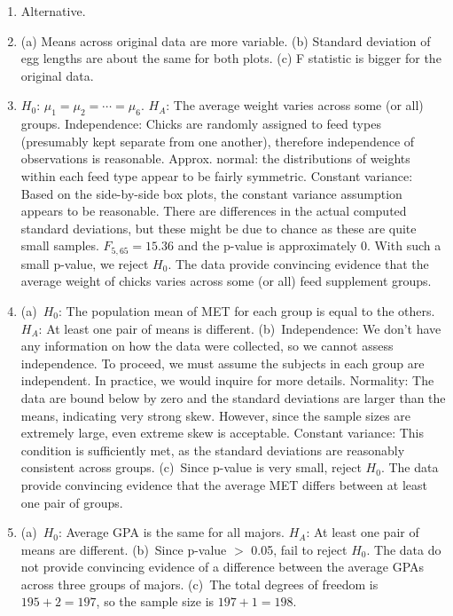 \documentclass[
  10pt,
  openany]{book}
\providecommand{\tightlist}{%
  \setlength{\itemsep}{0pt}\setlength{\parskip}{0pt}}
\begin{document}
\begin{enumerate}
\def\labelenumi{\arabic{enumi}.}
\tightlist
\item
  Alternative.

  \addtocounter{enumi}{1}
\item
  (a) Means across original data are more variable. (b) Standard deviation of egg lengths are about the same for both plots. (c) F statistic is bigger for the original data.

  \addtocounter{enumi}{1}
\item
  \(H_0\): \(\mu_1 = \mu_2 = \cdots = \mu_6\). \(H_A\): The average weight varies across some (or all) groups. Independence: Chicks are randomly assigned to feed types (presumably kept separate from one another), therefore independence of observations is reasonable. Approx. normal: the distributions of weights within each feed type appear to be fairly symmetric. Constant variance: Based on the side-by-side box plots, the constant variance assumption appears to be reasonable. There are differences in the actual computed standard deviations, but these might be due to chance as these are quite small samples. \(F_{5,65} = 15.36\) and the p-value is approximately 0. With such a small p-value, we reject \(H_0\). The data provide convincing evidence that the average weight of chicks varies across some (or all) feed supplement groups.

  \addtocounter{enumi}{1}
\item
  (a)~\(H_0\): The population mean of MET for each group is equal to the others. \(H_A\): At least one pair of means is different. (b)~Independence: We don't have any information on how the data were collected, so we cannot assess independence. To proceed, we must assume the subjects in each group are independent. In practice, we would inquire for more details. Normality: The data are bound below by zero and the standard deviations are larger than the means, indicating very strong skew. However, since the sample sizes are extremely large, even extreme skew is acceptable. Constant variance: This condition is sufficiently met, as the standard deviations are reasonably consistent across groups. (c)~Since p-value is very small, reject \(H_0\). The data provide convincing evidence that the average MET differs between at least one pair of groups.

  \addtocounter{enumi}{1}
\item
  (a)~\(H_0\): Average GPA is the same for all majors. \(H_A\): At least one pair of means are different. (b)~Since p-value \(>\) 0.05, fail to reject \(H_0\). The data do not provide convincing evidence of a difference between the average GPAs across three groups of majors. (c)~The total degrees of freedom is \(195 + 2 = 197\), so the sample size is \(197+1=198\).


\end{enumerate}
\end{document}
